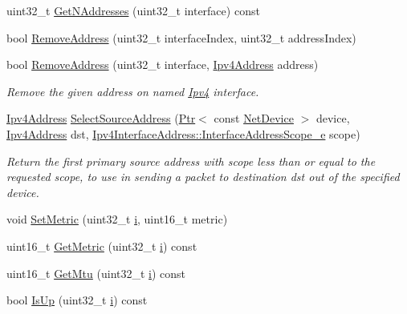 \begin{DoxyCompactItemize}
\item 
uint32\+\_\+t \hyperlink{classns3_1_1Ipv4L3Protocol_ab816ec1b5f680117bc1363b3d9649b22}{Get\+N\+Addresses} (uint32\+\_\+t interface) const 
\item 
bool \hyperlink{classns3_1_1Ipv4L3Protocol_a143bb06864cd386728afe563b9f554dc}{Remove\+Address} (uint32\+\_\+t interface\+Index, uint32\+\_\+t address\+Index)
\item 
bool \hyperlink{classns3_1_1Ipv4L3Protocol_a30338b1132156b86a8bbf5e6d17c6266}{Remove\+Address} (uint32\+\_\+t interface, \hyperlink{classns3_1_1Ipv4Address}{Ipv4\+Address} address)
\begin{DoxyCompactList}\small\item\em Remove the given address on named \hyperlink{classns3_1_1Ipv4}{Ipv4} interface. \end{DoxyCompactList}\item 
\hyperlink{classns3_1_1Ipv4Address}{Ipv4\+Address} \hyperlink{classns3_1_1Ipv4L3Protocol_aa7a0d27e88ef21b5e83b36c0e602b6c2}{Select\+Source\+Address} (\hyperlink{classns3_1_1Ptr}{Ptr}$<$ const \hyperlink{classns3_1_1NetDevice}{Net\+Device} $>$ device, \hyperlink{classns3_1_1Ipv4Address}{Ipv4\+Address} dst, \hyperlink{classns3_1_1Ipv4InterfaceAddress_a329cea433e74f717c26c9e51c4fcd3d8}{Ipv4\+Interface\+Address\+::\+Interface\+Address\+Scope\+\_\+e} scope)
\begin{DoxyCompactList}\small\item\em Return the first primary source address with scope less than or equal to the requested scope, to use in sending a packet to destination dst out of the specified device. \end{DoxyCompactList}\item 
void \hyperlink{classns3_1_1Ipv4L3Protocol_acdb26739ce815d86b85767edca3f0068}{Set\+Metric} (uint32\+\_\+t \hyperlink{lte__uplink__power__control_8m_a6f6ccfcf58b31cb6412107d9d5281426}{i}, uint16\+\_\+t metric)
\item 
uint16\+\_\+t \hyperlink{classns3_1_1Ipv4L3Protocol_af8445efaa4cb715717f0152d37b4ed34}{Get\+Metric} (uint32\+\_\+t \hyperlink{lte__uplink__power__control_8m_a6f6ccfcf58b31cb6412107d9d5281426}{i}) const 
\item 
uint16\+\_\+t \hyperlink{classns3_1_1Ipv4L3Protocol_ad5ec856c17f917cc47a10552ccdd9767}{Get\+Mtu} (uint32\+\_\+t \hyperlink{lte__uplink__power__control_8m_a6f6ccfcf58b31cb6412107d9d5281426}{i}) const 
\item 
bool \hyperlink{classns3_1_1Ipv4L3Protocol_a8f30b837b325a3e332e25d0da91cfbf4}{Is\+Up} (uint32\+\_\+t \hyperlink{lte__uplink__power__control_8m_a6f6ccfcf58b31cb6412107d9d5281426}{i}) const 

\end{DoxyCompactItemize}
